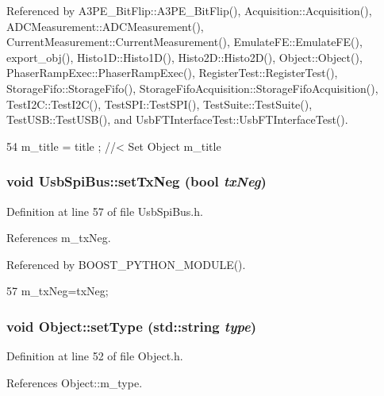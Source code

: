 Referenced by A3PE\_\-BitFlip::A3PE\_\-BitFlip(), Acquisition::Acquisition(), ADCMeasurement::ADCMeasurement(), CurrentMeasurement::CurrentMeasurement(), EmulateFE::EmulateFE(), export\_\-obj(), Histo1D::Histo1D(), Histo2D::Histo2D(), Object::Object(), PhaserRampExec::PhaserRampExec(), RegisterTest::RegisterTest(), StorageFifo::StorageFifo(), StorageFifoAcquisition::StorageFifoAcquisition(), TestI2C::TestI2C(), TestSPI::TestSPI(), TestSuite::TestSuite(), TestUSB::TestUSB(), and UsbFTInterfaceTest::UsbFTInterfaceTest().


\begin{DoxyCode}
54 { m_title = title ; } //< Set Object m_title
\end{DoxyCode}
\hypertarget{classUsbSpiBus_a6b15114d79e0d8002ba42f0301ff22a1}{
\subsubsection[{setTxNeg}]{\setlength{\rightskip}{0pt plus 5cm}void UsbSpiBus::setTxNeg (bool {\em txNeg})}}
\label{classUsbSpiBus_a6b15114d79e0d8002ba42f0301ff22a1}


Definition at line 57 of file UsbSpiBus.h.

References m\_\-txNeg.

Referenced by BOOST\_\-PYTHON\_\-MODULE().


\begin{DoxyCode}
57 { m_txNeg=txNeg; }
\end{DoxyCode}
\hypertarget{classObject_aae534cc9d982bcb9b99fd505f2e103a5}{
\subsubsection[{setType}]{\setlength{\rightskip}{0pt plus 5cm}void Object::setType (std::string {\em type})}}
\label{classObject_aae534cc9d982bcb9b99fd505f2e103a5}


Definition at line 52 of file Object.h.

References Object::m\_\-type.

